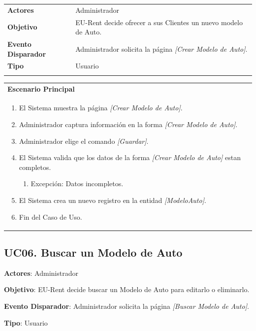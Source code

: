 \documentclass[10pt, letterpaper]{report}
\begin{document}
\begin{tabular}{ p{3.5cm} p{11.5cm} }
	\textbf{Actores} & Administrador \\
	\textbf{Objetivo} & EU-Rent decide ofrecer a sus Clientes un nuevo modelo de Auto. \\
	\textbf{Evento Disparador} & Administrador solicita la página \textit{[Crear Modelo de Auto]}. \\
	\textbf{Tipo} & Usuario \\
	\\
\end{tabular}

\begin{tabular}{ p{15.5cm} }
	\textbf{Escenario Principal} \\
	\begin{enumerate}
		\item El Sistema muestra la página \textit{[Crear Modelo de Auto]}.
		\item Administrador captura información en la forma \textit{[Crear Modelo de Auto]}.
		\item Administrador elige el comando \textit{[Guardar]}.
		\item El Sistema valida que los datos de la forma \textit{[Crear Modelo de Auto]} estan completos.
			\begin{enumerate}
				\item Excepción: Datos incompletos.
			\end{enumerate}
		\item El Sistema crea un nuevo registro en la entidad \textit{[ModeloAuto]}.
		\item Fin del Caso de Uso.
	\end{enumerate} \\
\end{tabular}




\subsection{UC06. Buscar un Modelo de Auto} \label{sec:cubuscarmodeloauto}
\textbf{Actores}: Administrador

\textbf{Objetivo}: EU-Rent decide buscar un Modelo de Auto para editarlo o eliminarlo.

\textbf{Evento Disparador}: Administrador solicita la página \textit{[Buscar Modelo de Auto]}.

\textbf{Tipo}: Usuario\\
\end{document}
